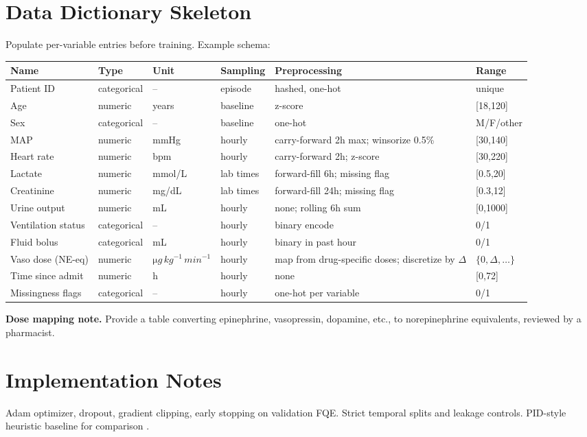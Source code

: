 \documentclass[11pt]{article}
\begin{document}
\section{Data Dictionary Skeleton}\label{sec:data-dict}
Populate per-variable entries before training. Example schema:
\begin{longtable}{p{3.2cm} p{1.8cm} p{1.8cm} p{1.6cm} p{4.6cm} p{2.2cm}}
\toprule
\textbf{Name} & \textbf{Type} & \textbf{Unit} & \textbf{Sampling} & \textbf{Preprocessing} & \textbf{Range}\\
\midrule
\endhead
Patient ID & categorical & -- & episode & hashed, one-hot & unique \\
Age & numeric & years & baseline & z-score & [18,120] \\
Sex & categorical & -- & baseline & one-hot & M/F/other \\
MAP & numeric & mmHg & hourly & carry-forward 2h max; winsorize 0.5\% & [30,140] \\
Heart rate & numeric & bpm & hourly & carry-forward 2h; z-score & [30,220] \\
Lactate & numeric & mmol/L & lab times & forward-fill 6h; missing flag & [0.5,20] \\
Creatinine & numeric & mg/dL & lab times & forward-fill 24h; missing flag & [0.3,12] \\
Urine output & numeric & mL & hourly & none; rolling 6h sum & [0,1000] \\
Ventilation status & categorical & -- & hourly & binary encode & 0/1 \\
Fluid bolus & categorical & mL & hourly & binary in past hour & 0/1 \\
Vaso dose (NE-eq) & numeric & $\si{\micro g\,kg^{-1}\,min^{-1}}$ & hourly & map from drug-specific doses; discretize by $\Delta$ & $\{0,\Delta,\ldots\}$ \\
Time since admit & numeric & h & hourly & none & [0,72] \\
Missingness flags & categorical & -- & hourly & one-hot per variable & 0/1 \\
\bottomrule
\end{longtable}
\textbf{Dose mapping note.} Provide a table converting epinephrine, vasopressin, dopamine, etc., to norepinephrine equivalents, reviewed by a pharmacist.

\section{Implementation Notes}
Adam optimizer, dropout, gradient clipping, early stopping on validation FQE. Strict temporal splits and leakage controls. PID-style heuristic baseline for comparison \citep{astrom2008feedback}.
\end{document}
